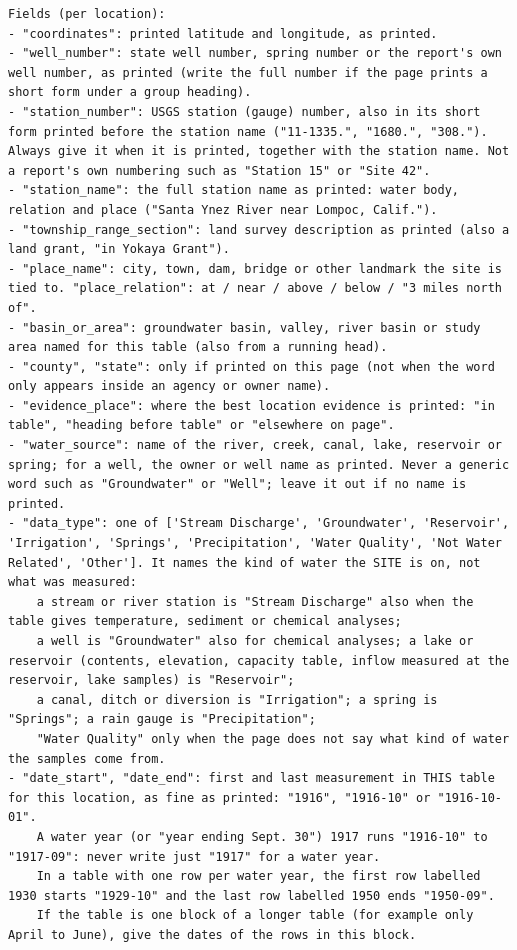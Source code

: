 \begin{lstlisting}
Fields (per location):
- "coordinates": printed latitude and longitude, as printed.
- "well_number": state well number, spring number or the report's own well number, as printed (write the full number if the page prints a short form under a group heading).
- "station_number": USGS station (gauge) number, also in its short form printed before the station name ("11-1335.", "1680.", "308."). Always give it when it is printed, together with the station name. Not a report's own numbering such as "Station 15" or "Site 42".
- "station_name": the full station name as printed: water body, relation and place ("Santa Ynez River near Lompoc, Calif.").
- "township_range_section": land survey description as printed (also a land grant, "in Yokaya Grant").
- "place_name": city, town, dam, bridge or other landmark the site is tied to. "place_relation": at / near / above / below / "3 miles north of".
- "basin_or_area": groundwater basin, valley, river basin or study area named for this table (also from a running head).
- "county", "state": only if printed on this page (not when the word only appears inside an agency or owner name).
- "evidence_place": where the best location evidence is printed: "in table", "heading before table" or "elsewhere on page".
- "water_source": name of the river, creek, canal, lake, reservoir or spring; for a well, the owner or well name as printed. Never a generic word such as "Groundwater" or "Well"; leave it out if no name is printed.
- "data_type": one of ['Stream Discharge', 'Groundwater', 'Reservoir', 'Irrigation', 'Springs', 'Precipitation', 'Water Quality', 'Not Water Related', 'Other']. It names the kind of water the SITE is on, not what was measured:
    a stream or river station is "Stream Discharge" also when the table gives temperature, sediment or chemical analyses;
    a well is "Groundwater" also for chemical analyses; a lake or reservoir (contents, elevation, capacity table, inflow measured at the reservoir, lake samples) is "Reservoir";
    a canal, ditch or diversion is "Irrigation"; a spring is "Springs"; a rain gauge is "Precipitation";
    "Water Quality" only when the page does not say what kind of water the samples come from.
- "date_start", "date_end": first and last measurement in THIS table for this location, as fine as printed: "1916", "1916-10" or "1916-10-01".
    A water year (or "year ending Sept. 30") 1917 runs "1916-10" to "1917-09": never write just "1917" for a water year.
    In a table with one row per water year, the first row labelled 1930 starts "1929-10" and the last row labelled 1950 ends "1950-09".
    If the table is one block of a longer table (for example only April to June), give the dates of the rows in this block.

\end{lstlisting}

